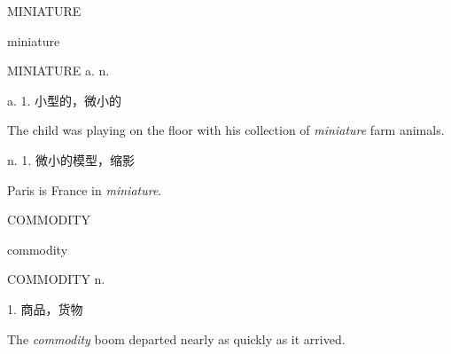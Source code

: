 \begin{flashcard}{
MINIATURE

miniature
}
\begin{center}
MINIATURE a. n. 
\end{center}
a. 1. 小型的，微小的

The child was playing on the floor with his collection of \textit{miniature} farm animals.

n. 1. 微小的模型，缩影

Paris is France in \textit{miniature}.

\end{flashcard}
\begin{flashcard}{
COMMODITY

commodity
}
\begin{center}
COMMODITY n. 
\end{center}
1. 商品，货物

The \textit{commodity} boom departed nearly as quickly as it arrived.

\end{flashcard}
